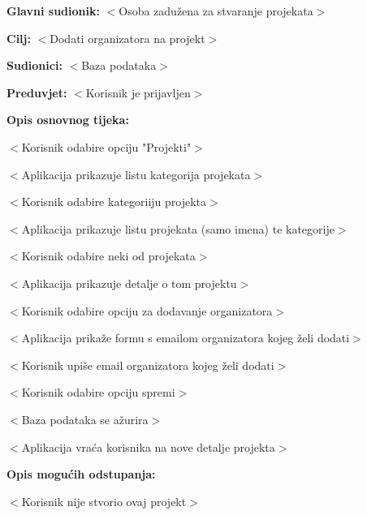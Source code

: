 					\noindent {}
					\begin{packed_item}
					
						\item \textbf{Glavni sudionik: }$<$Osoba zadužena za stvaranje projekata$>$
						\item  \textbf{Cilj:} $<$Dodati organizatora na projekt$>$
						\item  \textbf{Sudionici:} $<$Baza podataka$>$
						\item  \textbf{Preduvjet:} $<$Korisnik je prijavljen$>$
						\item  \textbf{Opis osnovnog tijeka:}
					
						\item[] \begin{packed_enum}
					
							\item $<$Korisnik odabire opciju "Projekti"$>$
							\item $<$Aplikacija prikazuje listu kategorija projekata$>$
							\item $<$Korisnik odabire kategoriiju projekta$>$
							\item $<$Aplikacija prikazuje listu projekata (samo imena) te kategorije$>$
							\item $<$Korisnik odabire neki od projekata$>$
							\item $<$Aplikacija prikazuje detalje o tom projektu$>$
							\item $<$Korisnik odabire opciju za dodavanje organizatora$>$
							\item $<$Aplikacija prikaže formu s emailom organizatora kojeg želi dodati$>$
							\item $<$Korisnik upiše email organizatora kojeg želi dodati$>$
							\item $<$Korisnik odabire opciju spremi$>$
							\item $<$Baza podataka se ažurira$>$
							\item $<$Aplikacija vraća korisnika na nove detalje projekta$>$
						\end{packed_enum}
					
						\item  \textbf{Opis mogućih odstupanja:}
					
						\item[] \begin{packed_item}
					
							\item[7.a] $<$Korisnik nije stvorio ovaj projekt$>$
							\item[] \begin{packed_enum}
			

\end{packed_enum}
\end{packed_item}
\end{packed_item}
